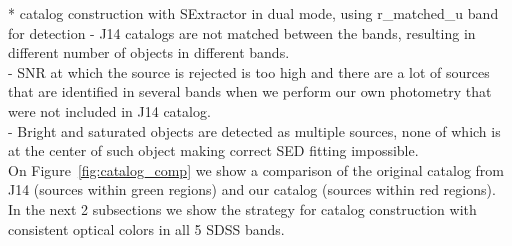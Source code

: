 \documentclass[numberedappendix,apj,twocolumn]{emulateapj}
\begin{document}
 
 
 *	catalog construction with SExtractor in dual mode, using r\_matched\_u band for detection
	-	J14 catalogs are not matched between the bands, resulting in different number of objects in different bands.\\
	-	SNR at which the source is rejected is too high and there are a lot of sources that are identified in several bands when we perform our own photometry that were not included in J14 catalog.\\
	-	Bright and saturated objects are detected as multiple sources, none of which is at the center of such object making correct SED fitting impossible. \\
	On Figure~\ref{fig:catalog_comp} we show a comparison of the original catalog from J14 (sources within green regions) and our catalog (sources within red regions). In the next 2 subsections we show the strategy for catalog construction with consistent optical colors in all 5 SDSS bands.
\end{document}
